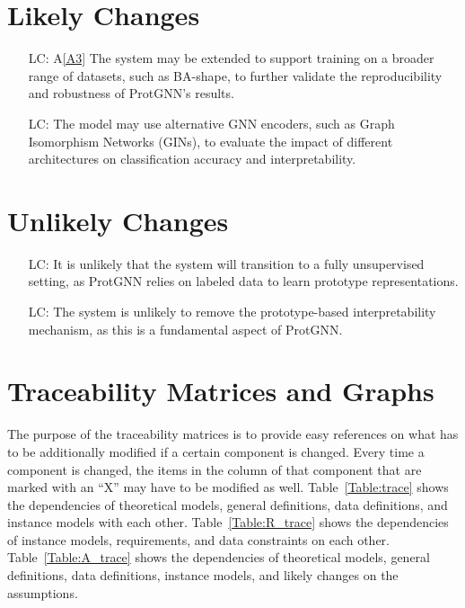 \documentclass[12pt]{article}
\newcommand{\aref}[1]{A\ref{#1}}
\newcounter{lcnum} %
\begin{document}
\section{Likely Changes}    

\noindent \begin{itemize}

\item[LC\refstepcounter{lcnum}\thelcnum\label{LC_Data}:] \aref{A3} The system may be extended to support training on a broader range of datasets, such as BA-shape,  to further validate the reproducibility and robustness of ProtGNN's results.

\item[LC\refstepcounter{lcnum}\thelcnum\label{LC_Encoder}:] The model may use alternative GNN encoders, such as Graph Isomorphism Networks (GINs), to evaluate the impact of different architectures on classification accuracy and interpretability.

\end{itemize}



\section{Unlikely Changes}    

\noindent \begin{itemize}

\item[LC\refstepcounter{lcnum}\thelcnum\label{LC_Unsupervised}:] It is unlikely that the system will transition to a fully unsupervised setting, as ProtGNN relies on labeled data to learn prototype representations.

\item[LC\refstepcounter{lcnum}\thelcnum\label{LC_Prot}:] The system is unlikely to remove the prototype-based interpretability mechanism, as this is a fundamental aspect of ProtGNN.

\end{itemize}

\section{Traceability Matrices and Graphs}

The purpose of the traceability matrices is to provide easy references on what
has to be additionally modified if a certain component is changed.  Every time a
component is changed, the items in the column of that component that are marked
with an ``X'' may have to be modified as well.  Table~\ref{Table:trace} shows the
dependencies of theoretical models, general definitions, data definitions, and
instance models with each other. Table~\ref{Table:R_trace} shows the
dependencies of instance models, requirements, and data constraints on each
other. Table~\ref{Table:A_trace} shows the dependencies of theoretical models,
general definitions, data definitions, instance models, and likely changes on
the assumptions.
\end{document}
